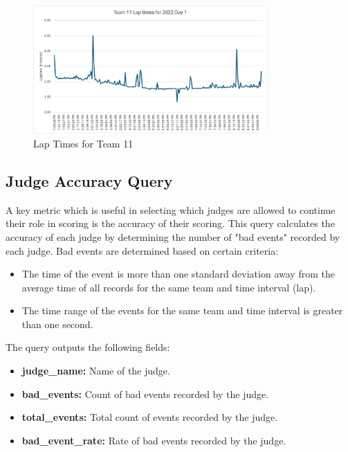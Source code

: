 \documentclass[11pt]{article}
\begin{document}
\begin{figure}[H]
    \centering
    \includegraphics[width=0.8\textwidth]{team11_lap_times.png}
    \caption{Lap Times for Team 11}
    \label{fig:team_11_lap_times}
\end{figure}


\pagebreak
\subsection{Judge Accuracy Query}

A key metric which is useful in selecting which judges are allowed to continue their role in scoring is the accuracy of their scoring. This query calculates the accuracy of each judge by determining the number of "bad events" recorded by each judge. Bad events are determined based on certain criteria:

\begin{itemize}
    \item The time of the event is more than one standard deviation away from the average time of all records for the same team and time interval (lap).
    \item The time range of the events for the same team and time interval is greater than one second.
\end{itemize}

\noindent
The query outputs the following fields:

\begin{itemize}
    \item \textbf{judge\_name:} Name of the judge.
    \item \textbf{bad\_events:} Count of bad events recorded by the judge.
    \item \textbf{total\_events:} Total count of events recorded by the judge.
    \item \textbf{bad\_event\_rate:} Rate of bad events recorded by the judge.
\end{itemize}
\end{document}
